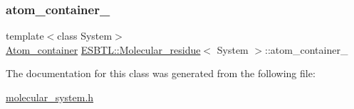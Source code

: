 \subsubsection{\texorpdfstring{atom\+\_\+container\+\_\+}{atom\_container\_}}
{\footnotesize\ttfamily template$<$class System$>$ \\
\hyperlink{classESBTL_1_1Molecular__residue_af354df2c3267d075215464cd408b8d78}{Atom\+\_\+container} \hyperlink{classESBTL_1_1Molecular__residue}{E\+S\+B\+T\+L\+::\+Molecular\+\_\+residue}$<$ System $>$\+::atom\+\_\+container\+\_\+\hspace{0.3cm}{\ttfamily [protected]}}



The documentation for this class was generated from the following file\+:\begin{DoxyCompactItemize}
\item 
\hyperlink{molecular__system_8h}{molecular\+\_\+system.\+h}\end{DoxyCompactItemize}
